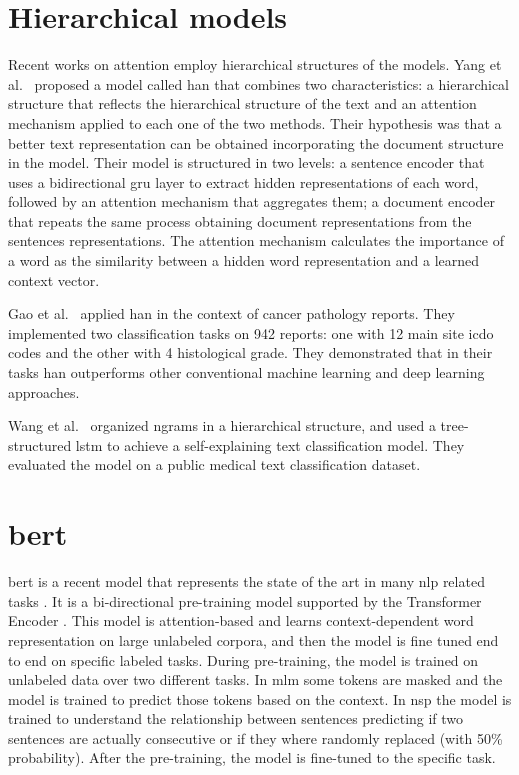 \section{Hierarchical models}
Recent works on attention employ hierarchical structures of the
models. Yang et al.\ \cite{yang_hierarchical_2016} proposed a model
called \ac{han}
that combines two characteristics: a hierarchical structure that
reflects the hierarchical structure of the text and an attention
mechanism applied to each one of the two methods. Their hypothesis was
that a better text representation can be obtained incorporating the
document structure in the model. Their model is structured in two
levels: a sentence encoder that uses a bidirectional \ac{gru} layer to
extract hidden 
representations of each word, followed by an attention mechanism that
aggregates them; a document encoder that repeats the same process
obtaining document representations from the
sentences representations. The attention mechanism calculates the
importance of a word as the similarity between a hidden word
representation and a learned context vector.

Gao et al.\ \cite{gao_hierarchical_2018} applied \ac{han}
\cite{yang_hierarchical_2016} in the context of cancer pathology
reports. They implemented two classification tasks on 942 reports: one
with 12 main site \ac{icdo} codes and the other with 4 histological
grade. They demonstrated that in their tasks \ac{han} outperforms other
conventional machine learning and deep learning approaches.  

Wang et al.\ \cite{wang2019multi} organized ngrams in a hierarchical
structure, and used a tree-structured \ac{lstm} to achieve a
self-explaining text classification model. They evaluated the model on
a public medical text classification dataset. 

\section{\acs{bert}}
\ac{bert} \cite{devlin2018bert} is a recent model that represents the
state of the art in many \ac{nlp} related tasks
\cite{chatterjee2019semeval,hu2019introductory,lee2019biobert,tshitoyan2019unsupervised}.
It is a
bi-directional pre-training model supported by the Transformer Encoder
\cite{vaswani2017attention}. This model is attention-based and
learns context-dependent word representation on large unlabeled
corpora, and then the model is fine tuned end to end on specific labeled
tasks. During pre-training, the model is trained
on unlabeled data over two different tasks. In \ac{mlm} some tokens
are masked and the model is trained to predict those tokens based on
the context. In \ac{nsp} the model is trained to understand the
relationship between sentences predicting if two sentences are actually
consecutive or if they where randomly replaced (with 50\%
probability). After the pre-training, the model is fine-tuned to the
specific task.



